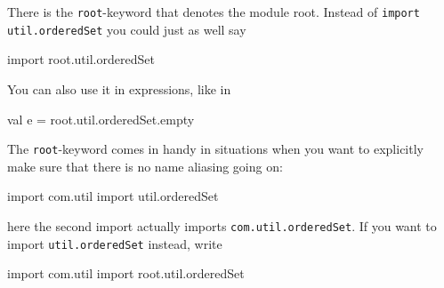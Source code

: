 \documentclass[11pt]{amsart}
\newcommand{\babelsrc}[1] {\lstinline!#1!}
\begin{document}
There is the \babelsrc{root}-keyword that denotes the module root.  Instead of \babelsrc{import util.orderedSet} you could just as well say
\begin{babellisting}
import root.util.orderedSet
\end{babellisting}
You can also use it in expressions, like in
\begin{babellisting}
val e = root.util.orderedSet.empty
\end{babellisting}
The \babelsrc{root}-keyword comes in handy in situations when you want to explicitly make sure that there is no name aliasing going on:
\begin{babellisting}
import com.util
import util.orderedSet
\end{babellisting}
here the second import actually imports \babelsrc{com.util.orderedSet}. If you want to import \babelsrc{util.orderedSet} instead, write
\begin{babellisting}
import com.util
import root.util.orderedSet
\end{babellisting}
\end{document}
